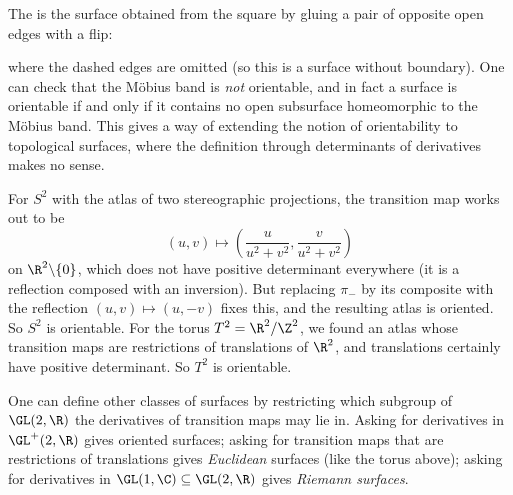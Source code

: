 \begin{example}
    The  is the surface obtained from the square by gluing a pair of opposite open edges with a flip:
    \begin{center}
    \end{center}
    where the dashed edges are omitted (so this is a surface without boundary). One can check that the M\"obius band is \emph{not} orientable, and in fact a surface is orientable if and only if it contains no open subsurface homeomorphic to the M\"obius band. This gives a way of extending the notion of orientability to topological surfaces, where the definition through determinants of derivatives makes no sense.
\end{example}

\begin{example}
    For $S^2$ with the atlas of two stereographic projections, the transition map works out to be
    $$
    (u, v) \mapsto \left(\frac{u}{u^2 + v^2}, \frac{v}{u^2 + v^2}\right)
    $$
    on $\R^2 \backslash \{0\}$, which does not have positive determinant everywhere (it is a reflection composed with an inversion). But replacing $\pi_-$ by its composite with the reflection $(u,v) \mapsto (u, -v)$ fixes this, and the resulting atlas is oriented. So $S^2$ is orientable.
    For the torus $T^2 = \R^2/\Z^2$, we found an atlas whose transition maps are restrictions of translations of $\R^2$, and translations certainly have positive determinant. So $T^2$ is orientable.
\end{example}

\begin{remark}
    One can define other classes of surfaces by restricting which subgroup of $\GL(2, \R)$ the derivatives of transition maps may lie in. Asking for derivatives in $\GL^+(2, \R)$ gives oriented surfaces; asking for transition maps that are restrictions of translations gives \emph{Euclidean} surfaces (like the torus above); asking for derivatives in $\GL(1, \C) \subseteq \GL(2, \R)$ gives \emph{Riemann surfaces}.
\end{remark}

